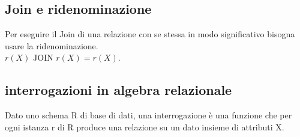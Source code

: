 \subsection*{Join e ridenominazione}
Per eseguire il Join di una relazione con se stessa in modo significativo bisogna usare la
ridenominazione.\\ $r(X) \,\, \text{JOIN} \,\,r(X) = r(X)$.\\
\subsection*{interrogazioni in algebra relazionale}
Dato uno schema R di base di dati, una interrogazione è una funzione che per ogni istanza r di R
produce una relazione su un dato insieme di attributi X.

 